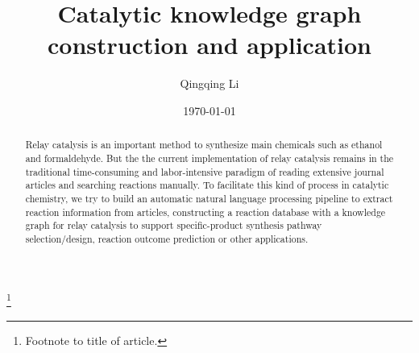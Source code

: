 \documentclass[%
 aip,
 jmp,%
 amsmath,amssymb,
 reprint,%
]{revtex4-2}
\begin{document}

\title[Catalytic knowledge graph construction and application]{Catalytic knowledge graph construction and application}%
\thanks{Footnote to title of article.}

\author{Qingqing Li}

\date{\today}%

\begin{abstract}
    
Relay catalysis is an important method to synthesize main chemicals such as ethanol and formaldehyde. But the 
the current implementation of relay catalysis remains in the traditional time-consuming 
and labor-intensive paradigm of reading extensive journal articles and searching reactions manually. 
To facilitate this kind of process in catalytic chemistry, we try to build an automatic natural 
language processing pipeline to extract reaction information from articles, constructing a reaction 
database with a knowledge graph for relay catalysis to support specific-product 
synthesis pathway selection/design, reaction outcome prediction or other applications.


%
\end{abstract}

\maketitle

\end{document}

